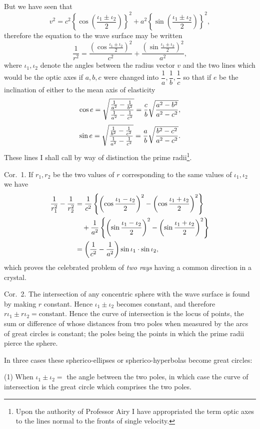 \documentclass[11pt]{article}
\newcommand{\sourcepage}[1]{\marginpar{\scriptsize p.~#1}}
\begin{document}
But we have seen that
\[
 v^2=c^2\left\{\cos\left(\frac{\iota_1\pm\iota_2}{2}\right)\right\}^2
    +a^2\left\{\sin\left(\frac{\iota_1\pm\iota_2}{2}\right)\right\}^2,
\]
therefore the equation to the wave surface may be written
\[
 \frac1{r^2}=\frac{\left(\cos\frac{\iota_1\pm\iota_2}{2}\right)^2}{c^2}
 +\frac{\left(\sin\frac{\iota_1\pm\iota_2}{2}\right)^2}{a^2},
\]
where $\iota_1,\iota_2$ denote the angles between the radius vector $v$ and the two lines which would be the optic axes if $a,b,c$ were changed into $\dfrac1a,\dfrac1b,\dfrac1c$ so that if $e$ be the inclination of either to the mean axis of elasticity
\[
 \cos e=\sqrt{\frac{\frac1{a^2}-\frac1{b^2}}{\frac1{a^2}-\frac1{c^2}}}
       ={c\over b}\sqrt{\frac{a^2-b^2}{a^2-c^2}},
\]
\[
 \sin e=\sqrt{\frac{\frac1{b^2}-\frac1{c^2}}{\frac1{a^2}-\frac1{c^2}}}
       ={a\over b}\sqrt{\frac{b^2-c^2}{a^2-c^2}}.
\]
These lines I shall call by way of distinction the prime radii\footnote{Upon the authority of Professor Airy I have appropriated the term optic axes to the lines normal to the fronts of single velocity.}.

\sourcepage{15}
Cor.~1. If $r_1,r_2$ be the two values of $r$ corresponding to the same values of $\iota_1,\iota_2$ we have
\begin{align*}
 \frac1{r_1^2}-\frac1{r_2^2}
 &={1\over c^2}\left\{\left(\cos{\iota_1-\iota_2\over2}\right)^2-\left(\cos{\iota_1+\iota_2\over2}\right)^2\right\}\\
 &\quad +{1\over a^2}\left\{\left(\sin{\iota_1-\iota_2\over2}\right)^2-\left(\sin{\iota_1+\iota_2\over2}\right)^2\right\}\\
 &=\left({1\over c^2}-{1\over a^2}\right)\sin\iota_1\cdot\sin\iota_2,
\end{align*}
which proves the celebrated problem of \emph{two rays} having a common direction in a crystal.

Cor.~2. The intersection of any concentric sphere with the wave surface is found by making $r$ constant. Hence $\iota_1\pm\iota_2$ becomes constant, and therefore $r\iota_1\pm r\iota_2=\mathrm{constant}$. Hence the curve of intersection is the locus of points, the sum or difference of whose distances from two poles when measured by the arcs of great circles is constant; the poles being the points in which the prime radii pierce the sphere.

In three cases these spherico-ellipses or spherico-hyperbolas become great circles:

(1) When $\iota_1\pm\iota_2=$ the angle between the two poles, in which case the curve of intersection is the great circle which comprises the two poles.
\end{document}
